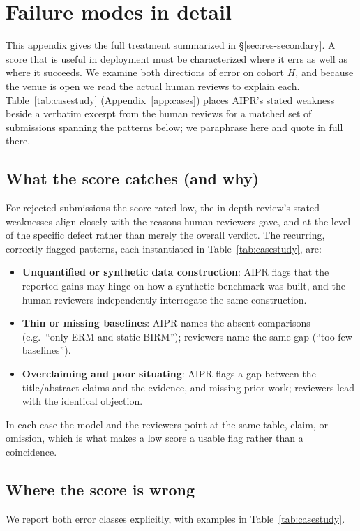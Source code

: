 \section{Failure modes in detail}
\label{sec:failure}

This appendix gives the full treatment summarized in \S\ref{sec:res-secondary}. A score
that is useful in deployment must be characterized where it errs as well as where it
succeeds. We examine both directions of error on cohort $H$, and because the venue is
open we read the actual human reviews to explain each.
Table~\ref{tab:casestudy} (Appendix~\ref{app:cases}) places AIPR's stated weakness
beside a verbatim excerpt from the human reviews for a matched set of submissions
spanning the patterns below; we paraphrase here and quote in full there.

\subsection{What the score catches (and why)}
For rejected submissions the score rated low, the in-depth review's stated
weaknesses align closely with the reasons human reviewers gave, and at the level of
the specific defect rather than merely the overall verdict. The recurring,
correctly-flagged patterns, each instantiated in Table~\ref{tab:casestudy}, are:
\begin{itemize}\itemsep1pt
  \item \textbf{Unquantified or synthetic data construction}: AIPR flags that the
  reported gains may hinge on how a synthetic benchmark was built, and the human
  reviewers independently interrogate the same construction.
  \item \textbf{Thin or missing baselines}: AIPR names the absent comparisons
  (e.g.\ ``only ERM and static BIRM''); reviewers name the same gap (``too few
  baselines'').
  \item \textbf{Overclaiming and poor situating}: AIPR flags a gap between the
  title/abstract claims and the evidence, and missing prior work; reviewers lead
  with the identical objection.
\end{itemize}
In each case the model and the reviewers point at the same table, claim, or
omission, which is what makes a low score a usable flag rather than a coincidence.

\subsection{Where the score is wrong}
We report both error classes explicitly, with examples in Table~\ref{tab:casestudy}.
